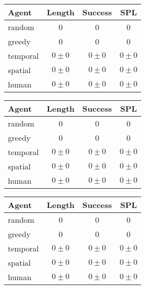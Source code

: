 \begin{tabular}{lccc}
    \toprule
    Agent & Length & Success & SPL \\
    \midrule
    random & 0 & 0 & 0 \\
    greedy & 0 & 0 & 0 \\
    temporal & \(0 \pm 0\) & \(0 \pm 0\) & \(0 \pm 0\) \\
    spatial & \(0 \pm 0\) & \(0 \pm 0\) & \(0 \pm 0\) \\
    human & \(0 \pm 0\) & \(0 \pm 0\) & \(0 \pm 0\) \\
    \bottomrule
\end{tabular}

\begin{tabular}{lccc}
    \toprule
    Agent & Length & Success & SPL \\
    \midrule
    random & 0 & 0 & 0 \\
    greedy & 0 & 0 & 0 \\
    temporal & \(0 \pm 0\) & \(0 \pm 0\) & \(0 \pm 0\) \\
    spatial & \(0 \pm 0\) & \(0 \pm 0\) & \(0 \pm 0\) \\
    human & \(0 \pm 0\) & \(0 \pm 0\) & \(0 \pm 0\) \\
    \bottomrule
\end{tabular}

\begin{tabular}{lccc}
    \toprule
    Agent & Length & Success & SPL \\
    \midrule
    random & 0 & 0 & 0 \\
    greedy & 0 & 0 & 0 \\
    temporal & \(0 \pm 0\) & \(0 \pm 0\) & \(0 \pm 0\) \\
    spatial & \(0 \pm 0\) & \(0 \pm 0\) & \(0 \pm 0\) \\
    human & \(0 \pm 0\) & \(0 \pm 0\) & \(0 \pm 0\) \\
    \bottomrule
\end{tabular}